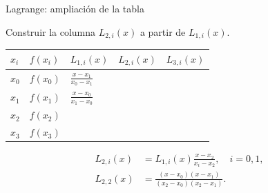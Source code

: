 \documentclass[original_version/main.tex]{subfiles}
\begin{document}
\begin{frame}[t]{Lagrange: ampliación de la tabla}
\par\noindent\begin{minipage}[t][10mm][t]{\textwidth}\small\strut Construir la columna $L_{2,i}(x)$ a partir de $L_{1,i}(x)$.\end{minipage}\par\nointerlineskip
\begin{minipage}[t]{\textwidth}\begingroup\scriptsize\setlength{\tabcolsep}{3pt}\begin{center}\begin{tabular}{|C{.065\textwidth}|C{.095\textwidth}|C{.19\textwidth}|C{.25\textwidth}|C{.25\textwidth}|}\hline
\rule[-2mm]{0pt}{6mm}$x_i$&$f(x_i)$&$L_{1,i}(x)$&$L_{2,i}(x)$&$L_{3,i}(x)$\\\hline
\rule[-2.5mm]{0pt}{8mm}$x_0$&$f(x_0)$&$\frac{x-x_1}{x_0-x_1}$&&\\\hline
\rule[-2.5mm]{0pt}{8mm}$x_1$&$f(x_1)$&$\frac{x-x_0}{x_1-x_0}$&&\\\hline
\rule[-2.5mm]{0pt}{8mm}$x_2$&$f(x_2)$&&&\\\hline
\rule[-2.5mm]{0pt}{8mm}$x_3$&$f(x_3)$&&&\\\hline
\end{tabular}\end{center}\endgroup\par
\end{minipage}\par\small\begin{align*}
L_{2,i}(x)&=L_{1,i}(x)\frac{x-x_2}{x_i-x_2},\quad i=0,1,\\
L_{2,2}(x)&=\frac{(x-x_0)(x-x_1)}{(x_2-x_0)(x_2-x_1)}.
\end{align*}
\end{frame}
\end{document}
